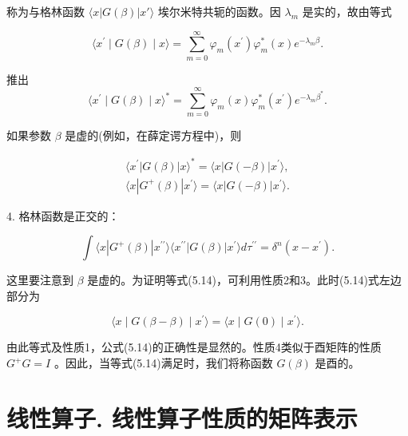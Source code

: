 称为与格林函数 $\langle x|G(\beta)|x'\rangle$ 埃尔米特共轭的函数。因 $\lambda_{m}$ 是实的，故由等式

\begin{equation*}
\langle x ^ {\prime} \mid G (\beta) \mid x \rangle = \sum_ {m = 0} ^ {\infty} \varphi_ {m} (x ^ {\prime}) \varphi_ {m} ^ {*} (x) e ^ {- \lambda_ {m} \beta}.
\end{equation*}

推出
\begin{equation*}
\langle x ^ {\prime} \mid G (\beta) \mid x \rangle^ {*} = \sum_ {m = 0} ^ {\infty} \varphi_ {m} (x) \varphi_ {m} ^ {*} (x ^ {\prime}) e ^ {- \lambda_ {m} \beta^ {*}}.
\end{equation*}

如果参数 $\beta$ 是虚的(例如，在薛定谔方程中)，则

\begin{equation*}
\begin{array}{l} \langle x ^ {\prime} | G (\beta) | x \rangle^ {*} = \langle x | G (- \beta) | x ^ {\prime} \rangle , \\ \langle x | G ^ {+} (\beta) | x ^ {\prime} \rangle = \langle x | G (- \beta) | x ^ {\prime} \rangle . \end{array}\tag{5.13}
\end{equation*}

4. 格林函数是正交的：

\begin{equation*}
\int \langle x | G ^ {+} (\beta) | x ^ {\prime \prime} \rangle \langle x ^ {\prime \prime} | G (\beta) | x ^ {\prime} \rangle d \tau^ {\prime \prime} = \delta^ {n} (x - x ^ {\prime}).\tag{5.14}
\end{equation*}

这里要注意到 $\beta$ 是虚的。为证明等式(5.14)，可利用性质2和3。此时(5.14)式左边部分为

\begin{equation*}
\langle x \mid G (\beta - \beta) \mid x ^ {\prime} \rangle = \langle x \mid G (0) \mid x ^ {\prime} \rangle .
\end{equation*}

由此等式及性质1，公式(5.14)的正确性是显然的。性质4类似于酉矩阵的性质 $G^{+}G = I$ 。因此，当等式(5.14)满足时，我们将称函数 $G(\beta)$ 是酉的。

\section{线性算子. 线性算子性质的矩阵表示}

